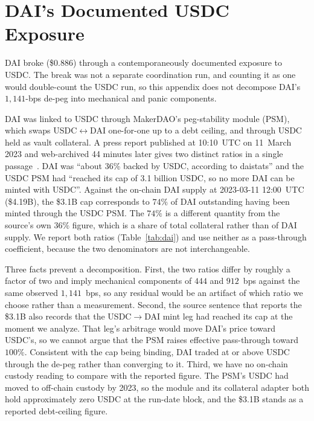 \section{DAI's Documented USDC Exposure}
\label{app:dai}

DAI broke (\$0.886) through a contemporaneously documented exposure to USDC. The break was not a
separate coordination run, and counting it as one would double-count the USDC run, so this
appendix does not decompose DAI's $1{,}141$-bps de-peg into mechanical and panic components.

DAI was linked to USDC through MakerDAO's peg-stability module (PSM), which swaps
USDC$\leftrightarrow$DAI one-for-one up to a debt ceiling, and through USDC held as vault
collateral. A press report published at 10:10~UTC on 11~March 2023 and web-archived 44 minutes
later gives two distinct ratios in a single passage~\cite{theblock2023psm}. DAI was ``about 36\%
backed by USDC, according to daistats'' and the USDC PSM had ``reached its cap of 3.1 billion
USDC, so no more DAI can be minted with USDC''. Against the on-chain DAI supply at
2023-03-11 12:00~UTC (\$4.19B), the \$3.1B cap corresponds to $74\%$ of DAI outstanding having
been minted through the USDC PSM. The $74\%$ is a different quantity from the source's own
$36\%$ figure, which is a share of total collateral rather than of DAI supply. We report both
ratios (Table~\ref{tab:dai}) and use neither as a pass-through coefficient, because the two denominators are not
interchangeable.

Three facts prevent a decomposition. First, the two ratios differ by roughly a factor of two
and imply mechanical components of $444$ and $912$~bps against the same observed $1{,}141$~bps,
so any residual would be an artifact of which ratio we choose rather than a measurement.
Second, the source sentence that reports the \$3.1B also records that the USDC$\to$DAI mint
leg had reached its cap at the moment we analyze. That leg's arbitrage would
move DAI's price toward USDC's, so we cannot argue that the PSM raises effective pass-through
toward $100\%$. Consistent with the cap being binding, DAI traded at or above USDC through the
de-peg rather than converging to it. Third, we have no on-chain custody reading to compare
with the reported figure. The PSM's USDC had moved to off-chain custody by 2023, so the
module and its collateral adapter both hold approximately zero USDC at the run-date block,
and the \$3.1B stands as a reported debt-ceiling figure.

